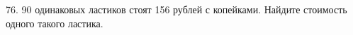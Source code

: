 76. 90 одинаковых ластиков стоят 156 рублей с копейками. Найдите стоимость одного такого ластика.\\
